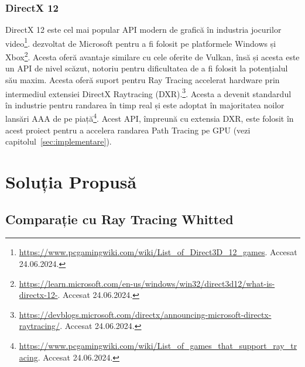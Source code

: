 \documentclass[12pt,a4paper]{report}
\numberwithin{equation}{section} %
\begin{document}
\subsection{DirectX 12}

DirectX 12 este cel mai popular API modern de grafică în industria jocurilor video\footnote{\url{https://www.pcgamingwiki.com/wiki/List_of_Direct3D_12_games}. Accesat 24.06.2024.}.
dezvoltat de Microsoft pentru a fi folosit pe platformele Windows și Xbox\footnote{\url{https://learn.microsoft.com/en-us/windows/win32/direct3d12/what-is-directx-12-}. Accesat 24.06.2024.}.
Acesta oferă avantaje similare cu cele oferite de Vulkan, însă și acesta este
un API de nivel scăzut, notoriu pentru dificultatea de a fi folosit la potențialul său maxim.
Acesta oferă suport pentru Ray Tracing accelerat hardware
prin intermediul extensiei DirectX Raytracing (DXR).\footnote{\url{https://devblogs.microsoft.com/directx/announcing-microsoft-directx-raytracing/}. Accesat 24.06.2024.}.
Acesta a devenit standardul în industrie pentru randarea în timp real și este
adoptat în majoritatea noilor lansări AAA de pe piață\footnote{\url{https://www.pcgamingwiki.com/wiki/List_of_games_that_support_ray_tracing}. Accesat 24.06.2024.}.
Acest API, împreună cu extensia DXR, este folosit în acest proiect pentru
a accelera randarea Path Tracing pe GPU (vezi capitolul~\ref{sec:implementare}).

\chapter{\label{sec:solutie}Soluția Propusă}

\section{Comparație cu Ray Tracing Whitted}
\end{document}
